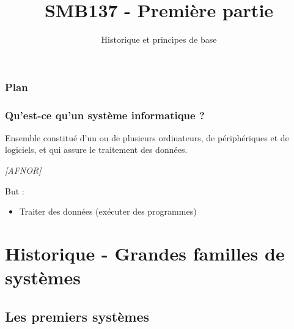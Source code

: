 

\title{SMB137 - Première partie}
\subtitle{Historique et principes de base}



\frame[plain]{\titlepage}

\begin{frame}
 \frametitle{Plan}
 \tableofcontents
\end{frame}

\begin{frame}
 \frametitle{Qu'est-ce qu'un système informatique ?}

  \begin{definition}
Ensemble constitué d'un ou de plusieurs ordinateurs, de périphériques et de logiciels, et qui assure le traitement des données.

\textit{[AFNOR]}
\end{definition}
But :
\begin{itemize}
\item Traiter des données (exécuter des programmes)
\end{itemize}
 \end{frame}


\section{Historique - Grandes familles de systèmes}
\subsection{Les premiers systèmes}

